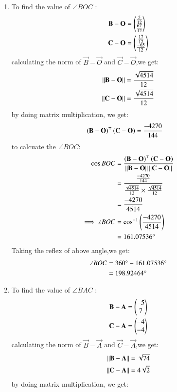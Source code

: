 \documentclass[journal,12pt,twocolumn]{IEEEtran}
\theoremstyle{remark}
\begin{document}
\begin{enumerate}
\item To find  the value of $\angle{BOC}$ :
\begin{align}
\mathbf{B}-\mathbf{O}
          &=\begin{pmatrix}\frac{5}{12}\\\frac{67}{12}\end{pmatrix}\\
\mathbf{C}-\mathbf{O}
          &=\begin{pmatrix}\frac{17}{12}\\\frac{-65}{12}\end{pmatrix}
\end{align}
calculating the norm of $\vec{B}-\vec{O}$ and $\vec{C}-\vec{O}$,we get:
\begin{align}
	\left\lVert\mathbf{B}-\mathbf{O}\right\rVert&= \frac{\sqrt{4514}}{12}\\
	\left\lVert\mathbf{C}-\mathbf{O}\right\rVert&= \frac{\sqrt{4514}}{12}
\end{align}
by doing matrix multiplication, we get:
\begin{align}
\left(\mathbf{B}-\mathbf{O}\right)^{\top}\left(\mathbf{C}-\mathbf{O}\right)&=\frac{-4270}{144}
\end{align}
to calcuate the $\angle{BOC}$:
\begin{align}
\cos{BOC}&=\frac{\left(\mathbf{B}-\mathbf{O}\right)^{\top}\left(\mathbf{C}-\mathbf{O}\right)}{\left\lVert\mathbf{B}-\mathbf{O}\right\rVert\left\lVert\mathbf{C}-\mathbf{O}\right\rVert}\\
&=\frac{\frac{-4270}{144}}{\frac{\sqrt{4514}}{12}\times\frac{\sqrt{4514}}{12}}\\
&=\frac{-4270}{4514}\\
\implies\angle{BOC}&=\cos^{-1}\left(\frac{-4270}{4514}\right)\\
&=161.07536\degree
\end{align}
Taking the reflex of above angle,we get:
\begin{align}
\angle{BOC}&=360\degree-161.07536\degree\\&=198.92464\degree\label{eq:1}
\end{align}
	\item To find  the value of $\angle{BAC}$ :
\begin{align}
\mathbf{B}-\mathbf{A}&=\begin{pmatrix}-5\\7\end{pmatrix}\\
\mathbf{C}-\mathbf{A}&=\begin{pmatrix}-4\\-4\end{pmatrix}
\end{align}
calculating the norm of $\vec{B}-\vec{A}$ and $\vec{C}-\vec{A}$,we get:
\begin{align}
	\left\lVert\mathbf{B}-\mathbf{A}\right\rVert&= \sqrt{74}\\
	\left\lVert\mathbf{C}-\mathbf{A}\right\rVert&= 4\sqrt{2}
\end{align}
by doing matrix multiplication, we get:
\begin{align}

\end{align}
\end{enumerate}
\end{document}
